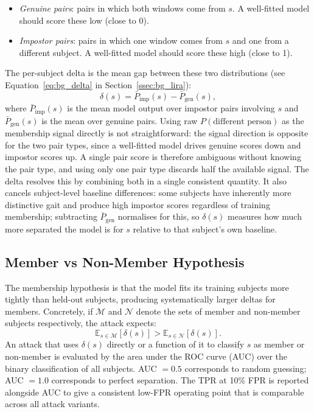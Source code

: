 \begin{itemize}
  \item \emph{Genuine pairs}: pairs in which both windows come from $s$.
    A well-fitted model should score these low (close to 0).
  \item \emph{Impostor pairs}: pairs in which one window comes from $s$ and
    one from a different subject.
    A well-fitted model should score these high (close to 1).
\end{itemize}

The per-subject delta is the mean gap between these two distributions (see Equation~\eqref{eq:bg_delta} in Section~\ref{ssec:bg_lira}):
\begin{equation*}
  \delta(s) = \bar{P}_{\text{imp}}(s) - \bar{P}_{\text{gen}}(s),
\end{equation*}
where $\bar{P}_{\text{imp}}(s)$ is the mean model output over impostor pairs involving $s$ and $\bar{P}_{\text{gen}}(s)$ is the mean over genuine pairs. Using raw $P(\text{different person})$ as the membership signal directly is not straightforward: the signal direction is opposite for the two pair types, since a well-fitted model drives genuine scores down and impostor scores up. A single pair score is therefore ambiguous without knowing the pair type, and using only one pair type discards half the available signal. The delta resolves this by combining both in a single consistent quantity. It also cancels subject-level baseline differences: some subjects have inherently more distinctive gait and produce high impostor scores regardless of training membership; subtracting $\bar{P}_{\text{gen}}$ normalises for this, so $\delta(s)$ measures how much more separated the model is for $s$ relative to that subject's own baseline.

\subsection{Member vs Non-Member Hypothesis}
\label{ssec:mia_hypothesis}

The membership hypothesis is that the model fits its training subjects more tightly than held-out subjects, producing systematically larger deltas for members. Concretely, if $\mathcal{M}$ and $\mathcal{N}$ denote the sets of member and non-member subjects respectively, the attack expects:
\begin{equation}
  \mathbb{E}_{s \in \mathcal{M}}[\delta(s)]
  > \mathbb{E}_{s \in \mathcal{N}}[\delta(s)].
\end{equation}
An attack that uses $\delta(s)$ directly or a function of it to classify $s$ as member or non-member is evaluated by the area under the ROC curve (AUC) over the binary classification of all subjects. AUC $= 0.5$ corresponds to random guessing; AUC $= 1.0$ corresponds to perfect separation. The TPR at 10\% FPR is reported alongside AUC to give a consistent low-FPR operating point that is comparable across all attack variants.

